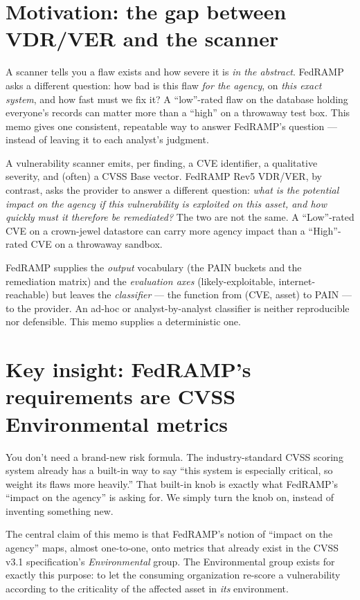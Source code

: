 \documentclass[11pt]{article}
\begin{document}
\section{Motivation: the gap between VDR/VER and the scanner}
\begin{plain}
A scanner tells you a flaw exists and how severe it is \emph{in the abstract}.
FedRAMP asks a different question: how bad is this flaw \emph{for the agency}, on
\emph{this exact system}, and how fast must we fix it? A ``low''-rated flaw on the
database holding everyone's records can matter more than a ``high'' on a throwaway
test box. This memo gives one consistent, repeatable way to answer FedRAMP's
question --- instead of leaving it to each analyst's judgment.
\end{plain}
A vulnerability scanner emits, per finding, a CVE identifier, a qualitative
severity, and (often) a CVSS Base vector. FedRAMP Rev5 VDR/VER, by contrast, asks
the provider to answer a different question: \emph{what is the potential impact on
the agency if this vulnerability is exploited on this asset, and how quickly must
it therefore be remediated?} The two are not the same. A ``Low''-rated CVE on a
crown-jewel datastore can carry more agency impact than a ``High''-rated CVE on a
throwaway sandbox.

FedRAMP supplies the \emph{output} vocabulary (the PAIN buckets and the remediation
matrix) and the \emph{evaluation axes} (likely-exploitable, internet-reachable) but
leaves the \emph{classifier} --- the function from (CVE, asset) to PAIN --- to the
provider. An ad-hoc or analyst-by-analyst classifier is neither reproducible nor
defensible. This memo supplies a deterministic one.

\section{Key insight: FedRAMP's requirements are CVSS Environmental metrics}
\begin{plain}
You don't need a brand-new risk formula. The industry-standard CVSS scoring system
already has a built-in way to say ``this system is especially critical, so weight
its flaws more heavily.'' That built-in knob is exactly what FedRAMP's ``impact on
the agency'' is asking for. We simply turn the knob on, instead of inventing
something new.
\end{plain}
The central claim of this memo is that FedRAMP's notion of ``impact on the agency''
maps, almost one-to-one, onto metrics that already exist in the CVSS v3.1
specification's \emph{Environmental} group. The Environmental group exists for
exactly this purpose: to let the consuming organization re-score a vulnerability
according to the criticality of the affected asset in \emph{its} environment.
\end{document}
